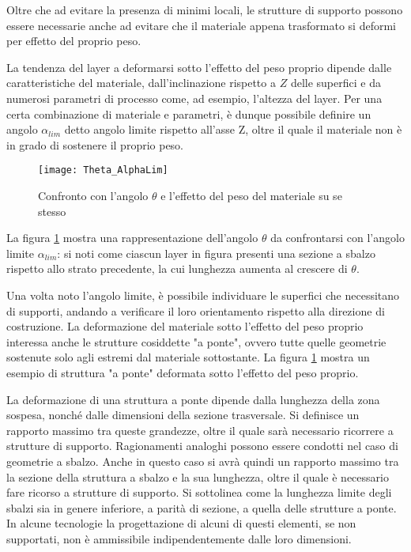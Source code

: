 Oltre che ad evitare la presenza di minimi locali, le strutture di supporto possono essere necessarie anche ad evitare che il materiale appena trasformato si deformi per effetto del proprio peso.

La tendenza del layer a deformarsi sotto l'effetto del peso proprio dipende dalle caratteristiche del materiale, dall'inclinazione rispetto a $Z$ delle superfici e da numerosi parametri di processo come, ad esempio, l'altezza del layer.
Per una certa combinazione di materiale e parametri, è dunque possibile definire un angolo
$\alpha_{lim}$ detto angolo limite rispetto all'asse Z, oltre il quale il materiale non è in grado di sostenere il proprio peso.

\begin{figure}
\centering
\texttt{[image: Theta\_AlphaLim]}
\caption{Confronto con l'angolo $\theta$ e l'effetto del peso del materiale su se stesso}
\label{fig:Theta_AlphaLim}
\end{figure}

La figura \ref{fig:Theta_AlphaLim} mostra una rappresentazione dell'angolo $\theta$ da confrontarsi con l'angolo limite $\alpha_{lim}$: si noti come ciascun layer in figura presenti una sezione a sbalzo rispetto allo strato precedente, la cui lunghezza aumenta al crescere di $\theta$.

Una volta noto l'angolo limite, è possibile individuare le superfici che necessitano di supporti, andando a verificare il loro orientamento rispetto alla direzione di costruzione.
La deformazione del materiale sotto l'effetto del peso proprio interessa anche le strutture cosiddette "a ponte", ovvero tutte quelle geometrie sostenute solo agli estremi dal materiale
sottostante.
La figura \ref{fig:Theta_AlphaLim} mostra un esempio di struttura "a ponte" deformata sotto l'effetto del peso proprio.

La deformazione di una struttura a ponte dipende dalla lunghezza della zona sospesa, nonché dalle dimensioni della sezione trasversale.
Si definisce un rapporto massimo tra queste grandezze, oltre il quale sarà necessario ricorrere a strutture di supporto.
Ragionamenti analoghi possono essere condotti nel caso di geometrie a sbalzo. Anche in questo caso si avrà quindi un rapporto massimo tra la sezione della struttura a sbalzo e la sua lunghezza, oltre il quale è necessario fare ricorso a strutture di supporto.
Si sottolinea come la lunghezza limite degli sbalzi sia in genere inferiore, a parità di sezione, a quella delle strutture a ponte.
In alcune tecnologie la progettazione di alcuni di questi elementi, se non supportati, non è ammissibile indipendentemente dalle loro dimensioni.


